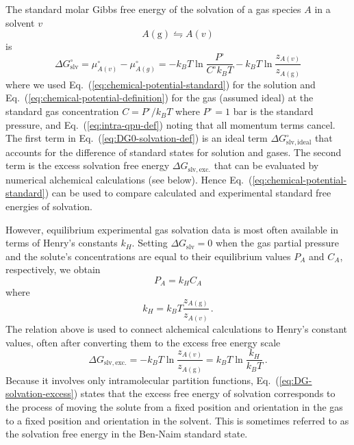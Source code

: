 \documentclass[9pt,bestpractices]{livecoms}
\begin{document}
The standard molar Gibbs free energy of the solvation of a gas species $A$ in a solvent $v$
\begin{equation}
A(\mathrm{g})  \leftrightharpoons A(v)
\end{equation}
is
\begin{equation}
  \Delta G^\circ_{\mathrm{slv}} = \mu^\circ_{A(v)}  - \mu^\circ_{A(g)} = -k_B T \ln \frac{P^\circ}{C^\circ k_B T} - k_B T \ln \frac{z_{A(v)}}{z_{A(\mathrm{g})}}
  \label{eq:DG0-solvation-def}
\end{equation}
where we used Eq.~(\ref{eq:chemical-potential-standard}) for the solution and  Eq.~(\ref{eq:chemical-potential-definition}) for the gas (assumed ideal) at the standard gas concentration $C = P^\circ/k_B T$ where $P^\circ = 1$ bar is the standard pressure, and Eq.~(\ref{eq:intra-qpu-def}) noting that all momentum terms cancel. The first term in Eq.~(\ref{eq:DG0-solvation-def}) is an ideal term $\Delta G^\circ_{\mathrm{slv,ideal}}$ that accounts for the difference of standard states for solution and gases. The second term is the excess solvation free energy $\Delta G_{\mathrm{slv, exc.}}$ that can be evaluated by numerical alchemical calculations (see below). Hence Eq.~(\ref{eq:chemical-potential-standard}) can be used to compare calculated and experimental standard free energies of solvation.

However, equilibrium experimental gas solvation data is most often available in terms of Henry's constants $k_H$. Setting $\Delta G_{\mathrm{slv}} = 0$ when the gas partial pressure and the solute's concentrations are equal to their equilibrium values $P_A$ and $C_A$, respectively, we obtain
\begin{equation}
  P_A = k_H C_A
  \label{eq:Henrys-law}
\end{equation}
where
\begin{equation}
  k_H = k_B T \frac{z_{A(\mathrm{g})}}{z_{A(v)}} \, .
  \label{eq:Henrys-constant}
\end{equation}
The relation above is used to connect alchemical calculations to Henry's constant values, often after converting them to the excess free energy scale~\cite{nicholls2008predicting,mobley2014freesolv}
\begin{equation}
\Delta G_{\mathrm{slv, exc.}} = - k_B T \ln \frac{z_{A(v)}}{z_{A(\mathrm{g})}} = k_B T \ln \frac{k_H}{k_B T} \, .
\label{eq:DG-solvation-excess}
\end{equation}
Because it involves only intramolecular partition functions, Eq.~(\ref{eq:DG-solvation-excess}) states that the excess free energy of solvation corresponds to the process of moving the solute from a fixed position and orientation in the gas to a fixed position and orientation in the solvent. This is sometimes referred to as the solvation free energy in the Ben-Naim standard state.~\cite{bennaim1984solvation}
\end{document}
